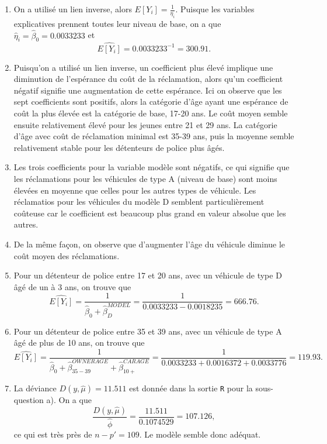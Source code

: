\begin{solution}{2.8}
\begin{enumerate}
\item On a utilisé un lien inverse, alors $E[Y_i]=\frac{1}{\eta_i}.$ Puisque les variables explicatives prennent toutes leur niveau de base, on a que $\hat{\eta}_i=\hat{\beta}_0=0.0033233$ et $$\widehat{E[Y_i]}=0.0033233^{-1}=300.91.$$

\item Puisqu'on a utilisé un lien inverse, un coefficient plus élevé implique une diminution de l'espérance du coût de la réclamation, alors qu'un coefficient négatif signifie une augmentation de cette espérance. Ici on observe que les sept coefficients sont positifs, alors la catégorie d'âge ayant une espérance de coût la plus élevée est la catégorie de base, 17-20 ans. Le coût moyen semble ensuite relativement élevé pour les jeunes entre 21 et 29 ans. La catégorie d'âge avec coût de réclamation minimal est 35-39 ans, puis la moyenne semble relativement stable pour les détenteurs de police plus âgés.

\item Les trois coefficients pour la variable modèle sont négatifs, ce qui signifie que les réclamations pour les véhicules de type A (niveau de base) sont moins élevées en moyenne que celles pour les autres types de véhicule. Les réclamatios pour les véhicules du modèle D semblent particulièrement coûteuse car le coefficient est beaucoup plus grand en valeur absolue que les autres.

\item De la même façon, on observe que d'augmenter l'âge du véhicule diminue le coût moyen des réclamations.

\item Pour un détenteur de police entre 17 et 20 ans, avec un véhicule de type D âgé de un à 3 ans, on trouve que $$\widehat{E[Y_i]}=\frac{1}{\hat{\beta}_0+\hat{\beta}^{MODEL}_D}=\frac{1}{0.0033233-0.0018235}=666.76.$$

\item Pour un détenteur de police entre 35 et 39 ans, avec un véhicule de type A âgé de plus de 10 ans, on trouve que $$\widehat{E[Y_i]}=\frac{1}{\hat{\beta}_0+\hat{\beta}^{OWNERAGE}_{35-39}+\hat{\beta}^{CARAGE}_{10+}}=\frac{1}{0.0033233+0.0016372+0.0033776}=119.93.$$

\item La déviance $D(y,\hat{\mu})=11.511$ est donnée dans la sortie \texttt{R} pour la sous-question a). On a que $$\frac{D(y,\hat{\mu})}{\hat{\phi}}=\frac{11.511}{0.1074529}=107.126,$$ ce qui est très près de $n-p'=109$. Le modèle semble donc adéquat.


\end{enumerate}
\end{solution}
